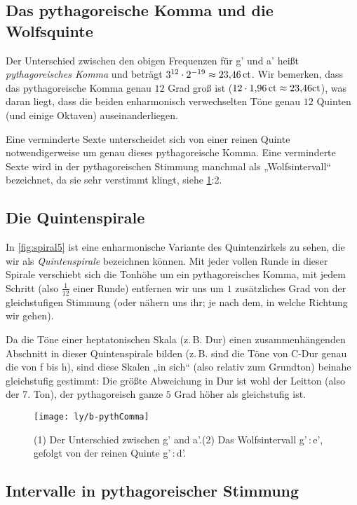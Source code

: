 \subsection{Das pythagoreische Komma und die Wolfsquinte}

Der Unterschied zwischen den obigen Frequenzen für \sharp g' und \flat a' heißt
\emph{pythagoreisches Komma} und beträgt
$3^{12}\cdot 2^{-19}\approx 23{,}46\,\text{ct}$. Wir bemerken, dass das
pythagoreische Komma genau $12$ Grad groß ist
($12\cdot 1{,}96\,\mathrm{ct}\approx 23{,}46\mathrm{ct}$), was daran liegt, dass die
beiden enharmonisch verwechselten Töne genau $12$ Quinten (und einige Oktaven)
auseinanderliegen.

Eine verminderte Sexte unterscheidet sich von einer reinen Quinte
notwendigerweise um genau dieses pythagoreische Komma. Eine verminderte Sexte
wird in der pythagoreischen Stimmung manchmal als „Wolfsintervall“ bezeichnet,
da sie sehr verstimmt klingt, siehe \cref{fig:pythComma}:2.

\subsection{Die Quintenspirale}

In \cref{fig:spiral5} ist eine enharmonische Variante des Quintenzirkels zu
sehen, die wir als \emph{Quintenspirale} bezeichnen können. Mit jeder vollen
Runde in dieser Spirale verschiebt sich die Tonhöhe um ein pythagoreisches
Komma, mit jedem Schritt (also $\frac1{12}$ einer Runde) entfernen wir uns um
$1$ zusätzliches Grad von der gleichstufigen Stimmung (oder nähern uns ihr; je
nach dem, in welche Richtung wir gehen).

Da die Töne einer heptatonischen Skala (z.\,B. Dur) einen zusammenhängenden
Abschnitt in dieser Quintenspirale bilden (z.\,B. sind die Töne von C-Dur genau
die von f bis h), sind diese Skalen „in sich“ (also relativ zum Grundton)
beinahe gleichstufig gestimmt: Die größte Abweichung in Dur ist wohl der Leitton
(also der 7. Ton), der pythagoreisch ganze $5$ Grad höher als gleichstufig ist.

\begin{figure}[h]
  \centering
  \texttt{[image: ly/b-pythComma]}
  \caption{(1) Der Unterschied zwischen \sharp g’ and \flat a’.\quad (2) Das
    Wolfsintervall \sharp g’\,:\,\flat e’, gefolgt von der reinen Quinte \sharp
    g’\,:\,\sharp d’.}\label{fig:pythComma}
\end{figure}

\subsection{Intervalle in pythagoreischer Stimmung}
\label{sec:pythInt}

